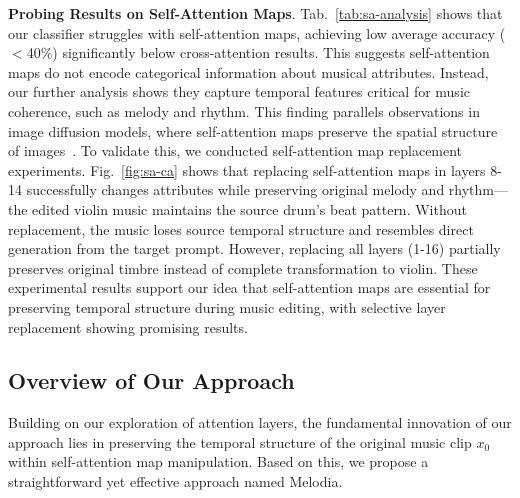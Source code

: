 \textbf{Probing Results on Self-Attention Maps}. Tab.~\ref{tab:sa-analysis} shows that our classifier struggles with self-attention maps, achieving low average accuracy ($<$40\%) significantly below cross-attention results.
This suggests self-attention maps do not encode categorical information about musical attributes. Instead, our further analysis shows they capture temporal features critical for music coherence, such as melody and rhythm.
This finding parallels observations in image diffusion models, where self-attention maps preserve the spatial structure of images~\cite{liu2024towardsunderstand}.
To validate this, we conducted self-attention map replacement experiments. 
Fig.~\ref{fig:sa-ca} shows that replacing self-attention maps in layers 8-14 successfully changes attributes while preserving original melody and rhythm—the edited violin music maintains the source drum's beat pattern.
Without replacement, the music loses source temporal structure and resembles direct generation from the target prompt.
However, replacing all layers (1-16) partially preserves original timbre instead of complete transformation to violin.
These experimental results support our idea that self-attention maps are essential for preserving temporal structure during music editing, with selective layer replacement showing promising results.

\subsection{Overview of Our Approach}

Building on our exploration of attention layers, the fundamental innovation of our approach lies in preserving the temporal structure of the original music clip $x_0$ within self-attention map manipulation. Based on this, we propose a straightforward yet effective approach named Melodia. 

